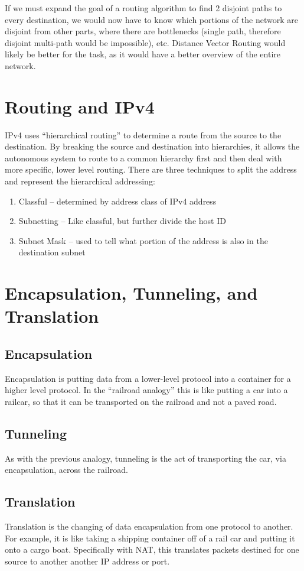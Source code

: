 \documentclass{article}
\begin{document}
If we must expand the goal of a routing algorithm to find 2 disjoint paths to every destination, we would now have to know which portions of the network are disjoint from other parts, where there are bottlenecks (single path, therefore disjoint multi-path would be impossible), etc. Distance Vector Routing would likely be better for the task, as it would have a better overview of the entire network.

\section{Routing and IPv4}
IPv4 uses ``hierarchical routing'' to determine a route from the source to the
destination. By breaking the source and destination into hierarchies, it allows
the autonomous system to route to a common hierarchy first and then deal with
more specific, lower level routing. There are three techniques to split the
address and represent the hierarchical addressing:
\begin{enumerate}
    \item Classful -- determined by address class of IPv4 address
    \item Subnetting -- Like classful, but further divide the host ID 
    \item Subnet Mask -- used to tell what portion of the address is also in
    the destination subnet
\end{enumerate}

\section{Encapsulation, Tunneling, and Translation}
\subsection{Encapsulation}
Encapsulation is putting data from a lower-level protocol into a container for a higher level protocol. In the ``railroad analogy'' this is like putting a car into a railcar, so that it can be transported on the railroad and not a paved road.
\subsection{Tunneling}
As with the previous analogy, tunneling is the act of transporting the car, via encapsulation, across the railroad.
\subsection{Translation}
Translation is the changing of data encapsulation from one protocol to another. For example, it is like taking a shipping container off of a rail car and putting it onto a cargo boat. Specifically with NAT, this translates packets destined for one source to another another IP address or port.
\end{document}
